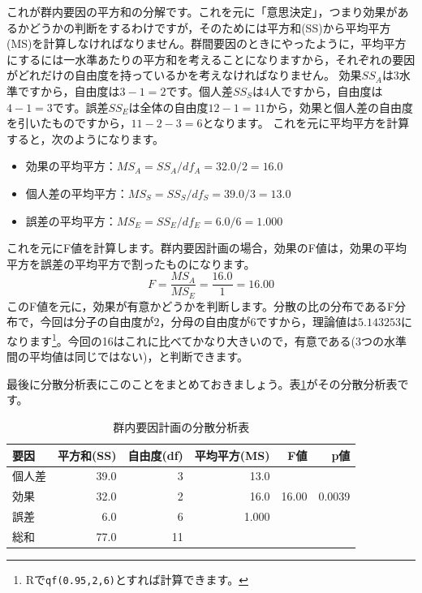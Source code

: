 \documentclass{ltjbook}
\begin{document}
これが群内要因の平方和の分解です。これを元に「意思決定」，つまり効果があるかどうかの判断をするわけですが，そのためには平方和(SS)から平均平方(MS)を計算しなければなりません。群間要因のときにやったように，平均平方にするには一水準あたりの平方和を考えることになりますから，それぞれの要因がどれだけの自由度を持っているかを考えなければなりません。
効果$SS_A$は3水準ですから，自由度は$3-1=2$です。個人差$SS_S$は4人ですから，自由度は$4-1=3$です。誤差$SS_E$は全体の自由度$12-1=11$から，効果と個人差の自由度を引いたものですから，$11-2-3=6$となります。
これを元に平均平方を計算すると，次のようになります。
\begin{itemize}
    \item 効果の平均平方：$MS_A = SS_A / df_A = 32.0 / 2 = 16.0$
    \item 個人差の平均平方：$MS_S = SS_S / df_S = 39.0 / 3 = 13.0$
    \item 誤差の平均平方：$MS_E = SS_E / df_E = 6.0 / 6 = 1.000$
\end{itemize}
これを元にF値を計算します。群内要因計画の場合，効果のF値は，効果の平均平方を誤差の平均平方で割ったものになります。
\[ F = \frac{MS_A}{MS_E} = \frac{16.0}{1} =16.00 \]
このF値を元に，効果が有意かどうかを判断します。分散の比の分布であるF分布で，今回は分子の自由度が$2$，分母の自由度が$6$ですから，理論値は$5.143253$になります\footnote{Rで\verb|qf(0.95,2,6)|とすれば計算できます。}。今回の16はこれに比べてかなり大きいので，有意である(3つの水準間の平均値は同じではない)，と判断できます。

最後に分散分析表にこのことをまとめておきましょう。表\ref{tbl:21_04}がその分散分析表です。
\begin{table}[h]
    \centering
    \caption{群内要因計画の分散分析表}
    \begin{tabular}{lrrrrr}
        \hline
        要因      & 平方和(SS) & 自由度(df) & 平均平方(MS) & F値    & p値  \\
        \hline
        個人差    & 39.0       & 3          & 13.0        &        &      \\
        \hline
        効果      & 32.0       & 2          & 16.0        & 16.00  &  0.0039\\
        誤差      & 6.0        & 6          & 1.000       &        &      \\
        \hline
        総和      & 77.0       & 11         &             &        &      \\
        \hline
    \end{tabular}
    \label{tbl:21_04}
\end{table}
\end{document}
